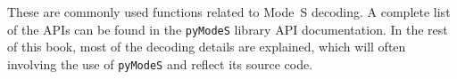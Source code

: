 These are commonly used functions related to Mode~S decoding. A complete list of the APIs can be found in the \texttt{pyModeS} library API documentation. In the rest of this book, most of the decoding details are explained, which will often involving the use of \texttt{pyModeS} and reflect its source code.
